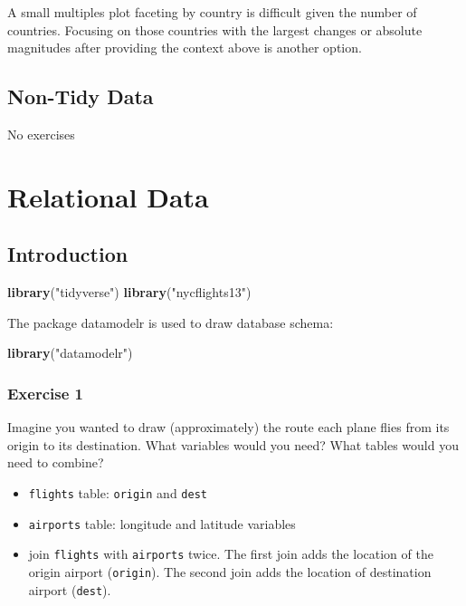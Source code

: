 \documentclass[]{book}
\newenvironment{Shaded}{\begin{snugshade}}{\end{snugshade}}
\newcommand{\KeywordTok}[1]{\textcolor[rgb]{0.13,0.29,0.53}{\textbf{#1}}}
\newcommand{\NormalTok}[1]{#1}
\newcommand{\StringTok}[1]{\textcolor[rgb]{0.31,0.60,0.02}{#1}}
\providecommand{\tightlist}{%
  \setlength{\itemsep}{0pt}\setlength{\parskip}{0pt}}
\theoremstyle{plain}
\theoremstyle{remark}
\theoremstyle{definition}
\theoremstyle{definition}
\theoremstyle{definition}
\theoremstyle{remark}
\begin{document}
A small multiples plot faceting by country is difficult given the number
of countries. Focusing on those countries with the largest changes or
absolute magnitudes after providing the context above is another option.

\hypertarget{non-tidy-data}{%
\section{Non-Tidy Data}\label{non-tidy-data}}

No exercises

\hypertarget{relational-data}{%
\chapter{Relational Data}\label{relational-data}}

\hypertarget{introduction-8}{%
\section{Introduction}\label{introduction-8}}

\begin{Shaded}
\begin{Highlighting}[]
\KeywordTok{library}\NormalTok{(}\StringTok{"tidyverse"}\NormalTok{)}
\KeywordTok{library}\NormalTok{(}\StringTok{"nycflights13"}\NormalTok{)}
\end{Highlighting}
\end{Shaded}

The package datamodelr is used to draw database schema:

\begin{Shaded}
\begin{Highlighting}[]
\KeywordTok{library}\NormalTok{(}\StringTok{"datamodelr"}\NormalTok{)}
\end{Highlighting}
\end{Shaded}

\hypertarget{exercise-1-26}{%
\subsection{Exercise 1}\label{exercise-1-26}}

Imagine you wanted to draw (approximately) the route each plane flies
from its origin to its destination. What variables would you need? What
tables would you need to combine?

\begin{itemize}
\tightlist
\item
  \texttt{flights} table: \texttt{origin} and \texttt{dest}
\item
  \texttt{airports} table: longitude and latitude variables
\item
  join \texttt{flights} with \texttt{airports} twice. The first join
  adds the location of the origin airport (\texttt{origin}). The second
  join adds the location of destination airport (\texttt{dest}).
\end{itemize}
\end{document}
